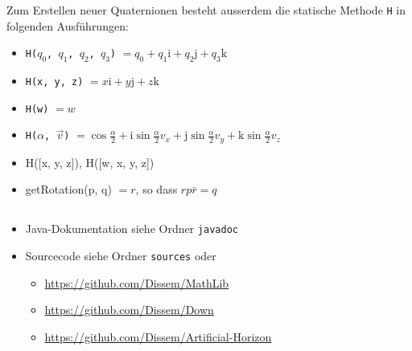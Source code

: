 \documentclass[12pt]{article}
\begin{document}
  Zum Erstellen neuer Quaternionen besteht ausserdem die statische Methode \texttt{H} in folgenden Ausführungen:
  \begin{itemize}
    \item \texttt{H($q_0$, $q_1$, $q_2$, $q_3$)} $= q_0 + q_1 \mathrm{i} + q_2 \mathrm{j} + q_3 \mathrm{k}$
    \item \texttt{H(x, y, z)} $= x \mathrm{i} + y \mathrm{j} + z \mathrm{k}$
    \item \texttt{H(w)} $= w$
    \item \texttt{H($\alpha$, $\vec{v}$)} $= \cos\frac{\alpha}{2} + \mathrm{i} \sin\frac{\alpha}{2} v_x + \mathrm{j} \sin\frac{\alpha}{2} v_y + \mathrm{k} \sin\frac{\alpha}{2} v_z$
    \item H([x, y, z]), H([w, x, y, z])
    \item getRotation(p, q) $= r$, so dass $r p \bar{r} = q$
  \end{itemize}

  \subsection{}
  \begin{itemize}
    \item Java-Dokumentation siehe Ordner \texttt{javadoc}
    \item Sourcecode siehe Ordner \texttt{sources} oder
    \begin{itemize}
      \item \url{https://github.com/Dissem/MathLib}
      \item \url{https://github.com/Dissem/Down}
      \item \url{https://github.com/Dissem/Artificial-Horizon}
    \end{itemize}
  \end{itemize}
\end{document}
